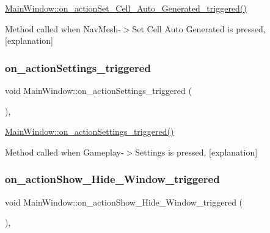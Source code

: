 \hyperlink{class_main_window_ae5dd5f28e8bbe2be6d69d8b4d05b0310}{Main\+Window\+::on\+\_\+action\+Set\+\_\+\+Cell\+\_\+\+Auto\+\_\+\+Generated\+\_\+triggered()} 

Method called when Nav\+Mesh-\/$>$Set Cell Auto Generated is pressed, \mbox{[}explanation\mbox{]} \mbox{\label{class_main_window_aa85aa1670a3d30f7987e4750aebe8a88}} 
\subsubsection{\texorpdfstring{on\+\_\+action\+Settings\+\_\+triggered}{on\_actionSettings\_triggered}}
{\footnotesize\ttfamily void Main\+Window\+::on\+\_\+action\+Settings\+\_\+triggered (\begin{DoxyParamCaption}{ }\end{DoxyParamCaption})\hspace{0.3cm}{\ttfamily [private]}, {\ttfamily [slot]}}



\hyperlink{class_main_window_aa85aa1670a3d30f7987e4750aebe8a88}{Main\+Window\+::on\+\_\+action\+Settings\+\_\+triggered()} 

Method called when Gameplay-\/$>$Settings is pressed, \mbox{[}explanation\mbox{]} \mbox{\label{class_main_window_a3de1a7a9eb5798b608bdb9fad1a442b5}} 
\subsubsection{\texorpdfstring{on\+\_\+action\+Show\+\_\+\+Hide\+\_\+\+Window\+\_\+triggered}{on\_actionShow\_Hide\_Window\_triggered}}
{\footnotesize\ttfamily void Main\+Window\+::on\+\_\+action\+Show\+\_\+\+Hide\+\_\+\+Window\+\_\+triggered (\begin{DoxyParamCaption}{ }\end{DoxyParamCaption})\hspace{0.3cm}{\ttfamily [private]}, {\ttfamily [slot]}}



